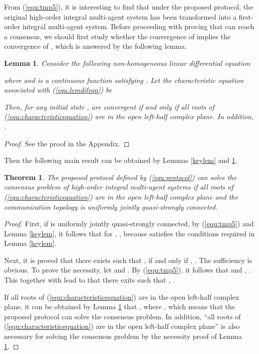 \documentclass[12pt,draftcls,onecolumn]{IEEEtran}
\newtheorem{lem}{Lemma}
\newtheorem{thm}{Theorem}
\begin{document}
From (\ref{equ:tmp5}), it is interesting to find that under the proposed protocol, the original high-order integral multi-agent system has been transformed into a first-order integral multi-agent system. Before proceeding with proving that   can reach a consensus, we should first study whether the convergence of  implies the convergence of , which is answered by the following lemma.

\begin{lem}\label{lem1}
Consider the following non-homogeneous linear differential equation

where  and  is a continuous function satisfying . Let the characteristic equation associated with (\ref{equ:lemdifeqn}) be

Then,
for any initial state ,  are convergent if and only if all roots of (\ref{equ:characteristicequation}) are in the open left-half complex plane. In addition, .
\end{lem}
\begin{proof}
See the proof in the Appendix.
\end{proof}

Then the following main result can be obtained by Lemmas \ref{keylem} and \ref{lem1}.
\begin{thm}\label{thm:main}
The proposed protocol defined by (\ref{equ:protocol}) can solve the consensus problem of high-order integral multi-agent systems if all roots of (\ref{equ:characteristicequation}) are in the open left-half complex plane and the communication topology  is uniformly jointly quasi-strongly connected.
\end{thm}
\begin{proof}
First, if  is uniformly jointly quasi-strongly connected, by (\ref{equ:tmp5}) and Lemma \ref{keylem}, it follows that for , , because  satisfies the conditions required in Lemma \ref{keylem}.

Next, it is proved that there exists  such that ,  if and only if  , .
The sufficiency is obvious. To prove the necessity, let  and . By (\ref{equ:tmp5}), it follows that  and , . This together with  lead to that there exits  such that , .

If all roots of (\ref{equ:characteristicequation}) are in the open left-half complex plane, it can be obtained by Lemma \ref{lem1} that ,  where , which means that the proposed protocol can solve the consensus problem. In addition, ``all roots of (\ref{equ:characteristicequation}) are in the open left-half complex plane'' is also necessary for solving the consensus problem by the necessity proof of Lemma \ref{lem1}.
\end{proof}
\end{document}
